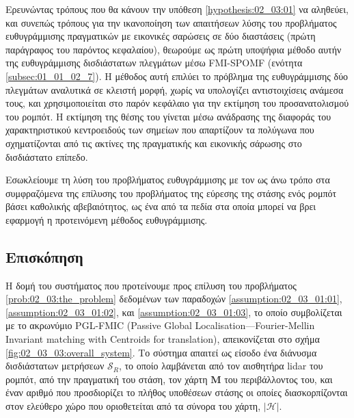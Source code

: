Ερευνώντας τρόπους που θα κάνουν την υπόθεση \ref{hypothesis:02_03:01} να
αληθεύει, και συνεπώς τρόπους για την ικανοποίηση των απαιτήσεων λύσης του
προβλήματος ευθυγράμμισης πραγματικών με εικονικές σαρώσεις σε δύο διαστάσεις
(πρώτη παράγραφος του παρόντος κεφαλαίου), θεωρούμε ως πρώτη υποψήφια μέθοδο
αυτήν της ευθυγράμμισης δισδιάστατων πλεγμάτων μέσω FMI-SPOMF (ενότητα
\ref{subsec:01_01_02_7}). Η μέθοδος αυτή επιλύει το πρόβλημα της ευθυγράμμισης
δύο πλεγμάτων αναλυτικά σε κλειστή μορφή, χωρίς να υπολογίζει αντιστοιχίσεις
ανάμεσα τους, και χρησιμοποιείται στο παρόν κεφάλαιο για την εκτίμηση του
προσανατολισμού του ρομπότ. Η εκτίμηση της θέσης του γίνεται μέσω ανάδρασης της
διαφοράς του χαρακτηριστικού κεντροειδούς των σημείων που απαρτίζουν τα
πολύγωνα που σχηματίζονται από τις ακτίνες της πραγματικής και εικονικής
σάρωσης στο δισδιάστατο επίπεδο.

Εσωκλείουμε τη λύση του προβλήματος ευθυγράμμισης με τον ως άνω τρόπο στα
συμφραζόμενα της επίλυσης του προβλήματος της εύρεσης της στάσης ενός ρομπότ
βάσει καθολικής αβεβαιότητος, ως ένα από τα πεδία στα οποία μπορεί να βρει
εφαρμογή η προτεινόμενη μέθοδος ευθυγράμμισης.

\subsection{Επισκόπηση}
\label{subsection:02_03_03:01}

Η δομή του συστήματος που προτείνουμε προς επίλυση του προβλήματος
\ref{prob:02_03:the_problem} δεδομένων των παραδοχών
\ref{assumption:02_03_01:01}, \ref{assumption:02_03_01:02}, και
\ref{assumption:02_03_01:03}, το οποίο συμβολίζεται με το ακρωνύμιο PGL-FMIC
(Passive Global Localisation---Fourier-Mellin Invariant matching with Centroids
for translation), απεικονίζεται στο σχήμα \ref{fig:02_03_03:overall_system}. Το
σύστημα απαιτεί ως είσοδο ένα διάνυσμα δισδιάστατων μετρήσεων $\mathcal{S}_R$,
το οποίο λαμβάνεται από τον αισθητήρα lidar του ρομπότ, από την πραγματική του
στάση, τον χάρτη $\bm{M}$ του περιβάλλοντος του, και έναν αριθμό που
προσδιορίζει το πλήθος υποθέσεων στάσης οι οποίες διασκορπίζονται στον
ελεύθερο χώρο που οριοθετείται από τα σύνορα του χάρτη, $|\mathcal{H}|$.

